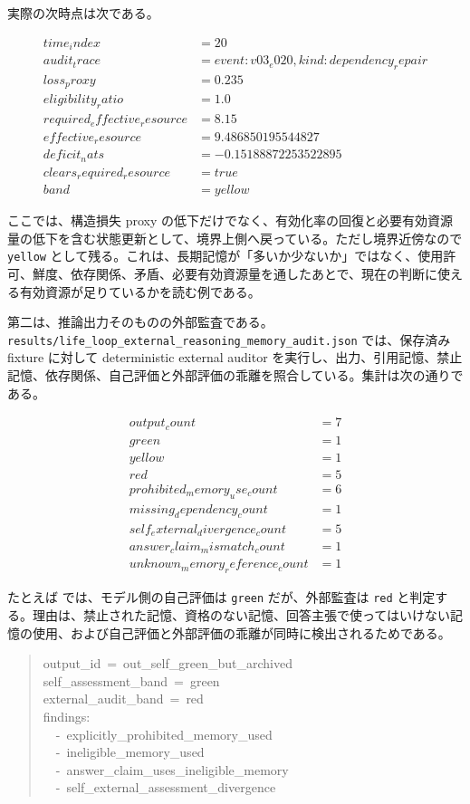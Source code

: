 \documentclass[12pt,a4paper]{article}
\begin{document}
実際の次時点は次である。

\[
\begin{aligned}
time_index &= 20 \\
audit_trace &= event:v03_e020, kind:dependency_repair \\
loss_proxy &= 0.235 \\
eligibility_ratio &= 1.0 \\
required_effective_resource &= 8.15 \\
effective_resource &= 9.486850195544827 \\
deficit_nats &= -0.15188872253522895 \\
clears_required_resource &= true \\
band &= yellow
\end{aligned}
\]

ここでは、構造損失 proxy の低下だけでなく、有効化率の回復と必要有効資源量の低下を含む状態更新として、境界上側へ戻っている。ただし境界近傍なので \texttt{yellow} として残る。これは、長期記憶が「多いか少ないか」ではなく、使用許可、鮮度、依存関係、矛盾、必要有効資源量を通したあとで、現在の判断に使える有効資源が足りているかを読む例である。

第二は、推論出力そのものの外部監査である。\texttt{results/life\_loop\_external\_reasoning\_memory\_audit.json} では、保存済み fixture に対して deterministic external auditor を実行し、出力、引用記憶、禁止記憶、依存関係、自己評価と外部評価の乖離を照合している。集計は次の通りである。

\[
\begin{aligned}
output_count &= 7 \\
green &= 1 \\
yellow &= 1 \\
red &= 5 \\
prohibited_memory_use_count &= 6 \\
missing_dependency_count &= 1 \\
self_external_divergence_count &= 5 \\
answer_claim_mismatch_count &= 1 \\
unknown_memory_reference_count &= 1
\end{aligned}
\]

たとえば {\scriptsize{}} では、モデル側の自己評価は \texttt{green} だが、外部監査は \texttt{red} と判定する。理由は、禁止された記憶、資格のない記憶、回答主張で使ってはいけない記憶の使用、および自己評価と外部評価の乖離が同時に検出されるためである。

\begin{quote}
{\small\ttfamily\noindent
output\_id~=~out\_self\_green\_but\_archived \\self\_assessment\_band~=~green \\external\_audit\_band~=~red \\findings: \\~~-~explicitly\_prohibited\_memory\_used \\~~-~ineligible\_memory\_used \\~~-~answer\_claim\_uses\_ineligible\_memory \\~~-~self\_external\_assessment\_divergence
}
\end{quote}
\end{document}
